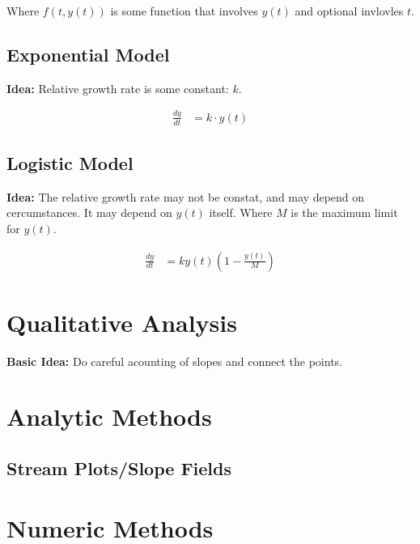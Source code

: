 \documentclass{article}
\begin{document}
Where $f(t,y(t))$ is some function that involves $y(t)$ and optional invlovles
$t$.

\subsection{Exponential Model}\label{sub:exponential_model}

\textbf{Idea:} Relative growth rate is some constant: $k$.

\begin{align}
  \frac{dy}{dt} &= k \cdot y(t)
\end{align}

\subsection{Logistic Model}\label{sub:logistic_model}

\textbf{Idea:} The relative growth rate may not be constat, and may depend on
cercumstances. It may depend on $y(t)$ itself. Where $M$ is the maximum limit
for $y(t)$.

\begin{align}
  \frac{dy}{dt} &= ky(t)\left(1-\frac{y(t)}{M}\right)
\end{align}

\section{Qualitative Analysis}\label{sec:qualitative_analysis}

\textbf{Basic Idea:} Do careful acounting of slopes and connect the points.

\section{Analytic Methods}\label{sec:analytic_methods}

\subsection{Stream Plots/Slope Fields}\label{sub:stream_plots_slope_fields}



\section{Numeric Methods}\label{sec:numeric_methods}
\end{document}
